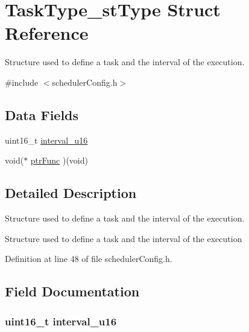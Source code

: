 \hypertarget{struct_task_type__st_type}{}\section{Task\+Type\+\_\+st\+Type Struct Reference}
\label{struct_task_type__st_type}


Structure used to define a task and the interval of the execution.  




{\ttfamily \#include $<$scheduler\+Config.\+h$>$}

\subsection*{Data Fields}
\begin{DoxyCompactItemize}
\item 
uint16\+\_\+t \hyperlink{struct_task_type__st_type_aa40544fbcdb815df9f6a9835488e484d}{interval\+\_\+u16}
\item 
void($\ast$ \hyperlink{struct_task_type__st_type_a86cfdbe6606dca2bdfa7ff9b37e9f9be}{ptr\+Func} )(void)
\end{DoxyCompactItemize}


\subsection{Detailed Description}
Structure used to define a task and the interval of the execution. 

Structure used to define a task and the interval of the execution 

Definition at line 48 of file scheduler\+Config.\+h.



\subsection{Field Documentation}
\hypertarget{struct_task_type__st_type_aa40544fbcdb815df9f6a9835488e484d}{}
\subsubsection[{interval\+\_\+u16}]{\setlength{\rightskip}{0pt plus 5cm}uint16\+\_\+t interval\+\_\+u16}\label{struct_task_type__st_type_aa40544fbcdb815df9f6a9835488e484d}


